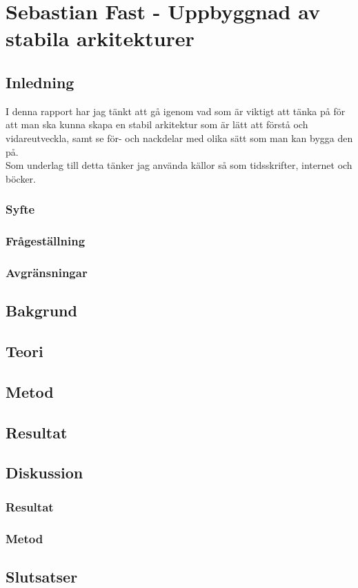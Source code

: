 \section{Sebastian Fast - Uppbyggnad av stabila arkitekturer}
\subsection{Inledning}
I denna rapport har jag tänkt att gå igenom vad som är viktigt att tänka på för att man ska kunna skapa en stabil arkitektur som är lätt att förstå och vidareutveckla, samt se för- och nackdelar med olika sätt som man kan bygga den på.
\\
Som underlag till detta tänker jag använda källor så som tidsskrifter, internet och böcker.   
\subsubsection{Syfte}
\subsubsection{Frågeställning}
\subsubsection{Avgränsningar}
\subsection{Bakgrund}
\subsection{Teori}
\subsection{Metod}
\subsection{Resultat}
\subsection{Diskussion}
\subsubsection{Resultat}
\subsubsection{Metod}
\subsection{Slutsatser}
